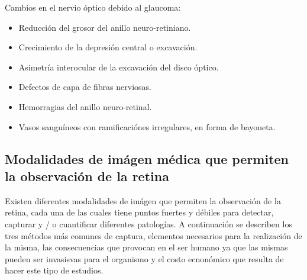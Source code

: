 Cambios en el nervio \'optico debido al glaucoma:
\begin{itemize}
	\item Reducci\'on del grosor del anillo neuro-retiniano.
	\item Crecimiento de la depresi\'on central o excavaci\'on.
	\item Asimetr\'ia interocular de la excavaci\'on del disco \'optico.
	\item Defectos de capa de fibras nerviosas.
	\item Hemorragias del anillo neuro-retinal.
	\item Vasos sangu\'ineos con ramificaci\'ones irregulares, en forma de bayoneta.
\end{itemize}



\subsection{Modalidades de im\'agen m\'edica que permiten la observaci\'on de la retina}
Existen diferentes modalidades de im\'agen que permiten la observaci\'on de la retina, cada una de las cuales tiene puntos fuertes y d\'ebiles para detectar, capturar y / o cuantificar diferentes patolog\'ias. A continuaci\'on se describen los tres m\'etodos m\'as comunes de captura, elementos necesarios para la realizaci\'on de la misma, las consecuencias que provocan en el ser humano ya que las mismas pueden ser invasisvas para el organismo y el costo ecnon\'omico que resulta de hacer este tipo de estudios.
